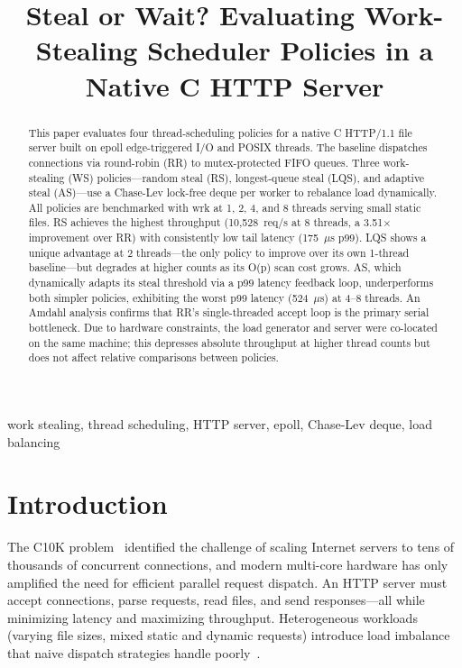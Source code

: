 \documentclass[conference]{IEEEtran}
\begin{document}
\title{Steal or Wait? Evaluating Work-Stealing Scheduler Policies in a Native C HTTP Server}

\author{
}

\maketitle

\begin{abstract}
This paper evaluates four thread-scheduling policies for a native C HTTP/1.1 file server built on epoll edge-triggered I/O and POSIX threads. The baseline dispatches connections via round-robin (RR) to mutex-protected FIFO queues. Three work-stealing (WS) policies---random steal (RS), longest-queue steal (LQS), and adaptive steal (AS)---use a Chase-Lev lock-free deque per worker to rebalance load dynamically. All policies are benchmarked with wrk at 1, 2, 4, and 8 threads serving small static files. RS achieves the highest throughput (10,528~req/s at 8 threads, a 3.51$\times$ improvement over RR) with consistently low tail latency (175~$\mu$s p99). LQS shows a unique advantage at 2 threads---the only policy to improve over its own 1-thread baseline---but degrades at higher counts as its O(p) scan cost grows. AS, which dynamically adapts its steal threshold via a p99 latency feedback loop, underperforms both simpler policies, exhibiting the worst p99 latency (524~$\mu$s) at 4--8 threads. An Amdahl analysis confirms that RR's single-threaded accept loop is the primary serial bottleneck. Due to hardware constraints, the load generator and server were co-located on the same machine; this depresses absolute throughput at higher thread counts but does not affect relative comparisons between policies.
\end{abstract}

\begin{IEEEkeywords}
work stealing, thread scheduling, HTTP server, epoll, Chase-Lev deque, load balancing
\end{IEEEkeywords}

\section{Introduction}

The C10K problem~\cite{b6} identified the challenge of scaling Internet servers to tens of thousands of concurrent connections, and modern multi-core hardware has only amplified the need for efficient parallel request dispatch. An HTTP server must accept connections, parse requests, read files, and send responses---all while minimizing latency and maximizing throughput. Heterogeneous workloads (varying file sizes, mixed static and dynamic requests) introduce load imbalance that naive dispatch strategies handle poorly~\cite{b7,b8}.
\end{document}
